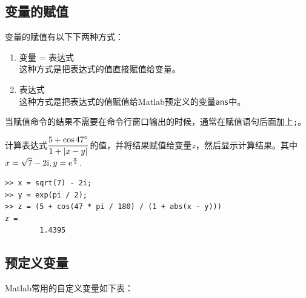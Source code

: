 \subsection{变量的赋值}
变量的赋值有以下下两种方式：
\begin{enumerate}[\hspace{3em}$\bullet$]
	\item 变量 = 表达式\\
	这种方式是把表达式的值直接赋值给变量。
	\item 表达式\\
	这种方式是把表达式的值赋值给Matlab预定义的变量\lstinline|ans|中。
\end{enumerate}

当赋值命令的结果不需要在命令行窗口输出的时候，通常在赋值语句后面加上\lstinline|;|。

\examples 计算表达式$\dfrac{5+\cos 47{}^{\circ}}{1+|x-y|}$的值，并将结果赋值给变量$z$，然后显示计算结果。其中$\displaystyle x = \sqrt{7} - 2\text{i}, y = {\rm{e}}^{\frac{\pi}{2}}$.\vspace{0.5em}

\begin{lstlisting}
>> x = sqrt(7) - 2i;
>> y = exp(pi / 2);
>> z = (5 + cos(47 * pi / 180) / (1 + abs(x - y)))
z =
		1.4395
\end{lstlisting}

\subsection{预定义变量}
Matlab常用的自定义变量如下表：
\begin{table}[!htb]
	\centering
\end{table}

